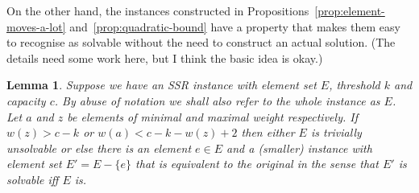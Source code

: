 \documentclass{robinminion}
\newtheorem{lemma}[prop]{Lemma}
\begin{document}
\noindent On the other hand, the instances constructed in Propositions~\ref{prop:element-moves-a-lot} and~\ref{prop:quadratic-bound} have a property that makes them easy to recognise as solvable without the need to construct an actual solution. (The details need some work here, but I think the basic idea is okay.)
\begin{lemma}\label{lemma:reduction}
    Suppose we have an SSR instance with element set $E$, threshold $k$ and capacity $c$. By abuse of notation we shall also refer to the whole instance as $E$. Let $a$ and $z$ be elements of minimal and maximal weight respectively. If $w(z) > c-k$ or $w(a) < c-k-w(z) + 2$ then either $E$ is trivially unsolvable or else there is an element $e\in E$ and a (smaller) instance with element set $E' = E-\{e\}$ that is equivalent to the original in the sense that $E'$ is solvable iff $E$ is.
\end{lemma}
\end{document}
